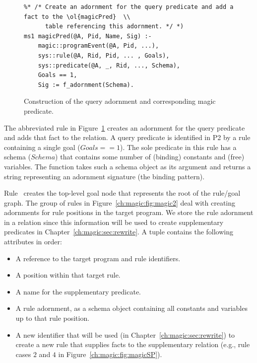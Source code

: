 \begin{figure}
\ssp
\centering
\begin{lstlisting}
%* /* Create an adornment for the query predicate and add a fact to the \ol{magicPred}  \\
      table referencing this adornment. */ *)
ms1 magicPred(@A, Pid, Name, Sig) :-
    magic::programEvent(@A, Pid, ...),
    sys::rule(@A, Rid, Pid, ... , Goals),
    sys::predicate(@A, _, Rid, ..., Schema),
    Goals == 1,
    Sig := f_adornment(Schema).
\end{lstlisting}
\caption{\label{ch:magic:fig:magic1}Construction of the query adornment and corresponding magic predicate.}
\end{figure}

The abbreviated rule in Figure~\ref{ch:magic:fig:magic1} creates an adornment
for the query predicate and adds that fact to the  relation.  A
query predicate is identified in P2 by a rule containing a single goal ($Goals
== 1$).  The sole predicate in this rule has a schema ($Schema$) that contains
some number of (binding) constants and (free) variables.  The function  
takes such a schema object as its argument and returns a string
representing an adornment signature (the binding pattern).

Rule~ creates the top-level goal node that represents the root of the
rule/goal graph.  The group of rules in Figure~\ref{ch:magic:fig:magic2} deal
with creating adornments for rule positions in the target program.  We store
the rule adornment in a  relation since this information will be used
to create supplementary predicates in Chapter~\ref{ch:magic:sec:rewrite}.  A
 tuple contains the following attributes in order:
\begin{itemize}
   \ssp
  \item A reference to the target program and rule identifiers. 
  \item A position within that target rule.
  \item A name for the supplementary predicate.
  \item A rule adornment, as a schema object containing all constants and variables up to that rule position.
  \item A new identifier that will be used (in Chapter~\ref{ch:magic:sec:rewrite}) to create 
    a new rule that supplies facts to the supplementary relation (e.g., rule cases $2$ and $4$ 
    in Figure~\ref{ch:magic:fig:magicSP}).
\end{itemize}

